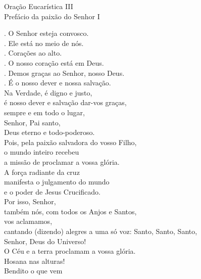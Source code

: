 \documentclass{book}
\begin{document}
\begin{center}
    \textcolor{VioletRed2}{Oração Eucarística III \\ \small Prefácio da paixão do Senhor I}
\end{center}
\begin{flushleft}
    {\color{VioletRed2} \Vbar.} O Senhor esteja convosco. \\
    {\color{VioletRed2} \Rbar.} Ele está no meio de nós. \\
    {\color{VioletRed2} \Vbar.} Corações ao alto. \\
    {\color{VioletRed2} \Rbar.} O nosso coração está em Deus. \\
    {\color{VioletRed2} \Vbar.} Demos graças ao Senhor, nosso Deus. \\
    {\color{VioletRed2} \Rbar.} É o nosso dever e nossa salvação.
    \vspace{.2cm} \\
    Na Verdade, é digno e justo, \\
    é nosso dever e salvação dar-vos graças, \\
    sempre e em todo o lugar, \\
    Senhor, Pai santo, \\
    Deus eterno e todo-poderoso.
    \vspace{.2cm} \\
    Pois, pela paixão salvadora do vosso Filho, \\
    o mundo inteiro recebeu \\
    a missão de proclamar a vossa glória. \\
    A força radiante da cruz \\
    manifesta o julgamento do mundo \\
    e o poder de Jesus Crucificado.
    \vspace{.2cm} \\
    Por isso, Senhor, \\
    também nós, com todos os Anjos e Santos, \\
    vos aclamamos, \\
    cantando {\color{VioletRed2}(}dizendo{\color{VioletRed2})} alegres a uma só voz:
    \newpage
    Santo, Santo, Santo, \\
    Senhor, Deus do Universo! \\
    O Céu e a terra proclamam a vossa glória. \\
    Hosana nas alturas! \\
    Bendito o que vem \\

\end{flushleft}
\end{document}
